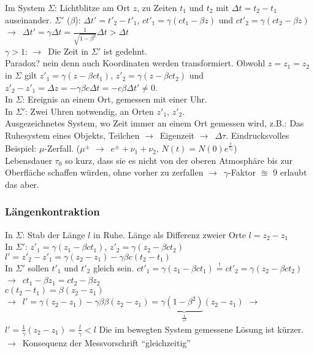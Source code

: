\documentclass[oneside]{book}
\theoremstyle{definition}
\newcommand{\conseq}{$\rightarrow$~}
\begin{document}
Im System $\Sigma$: Lichtblitze am Ort $z$, zu Zeiten $t_1$ und $t_2$ mit $\Delta t = t_2 - t_1$ auseinander.
$\Sigma'$ ($\beta$): $\Delta t' = t'_2 - t'_1$, $c t'_1 = \gamma (c t_1 - \beta z)$ und $c t'_2 = \gamma (ct_2 - \beta z)$\\
\conseq $\Delta t' = \gamma \Delta t = \frac{1}{\sqrt{1 - \beta^2}} \Delta t > \Delta t$\\
$\gamma > 1$: \conseq Die Zeit in $\Sigma'$ ist gedehnt.\\
Paradox? nein denn auch Koordinaten werden transformiert. Obwohl  $z = z_1 = z_2$ in $\Sigma$ gilt $z'_1 = \gamma (z - \beta c t_1)$, $z'_2 = \gamma (z - \beta c t_2)$ und $z'_2 - z'_1 = \Delta z = - \gamma \beta c \Delta t = - c \beta \Delta t' \neq 0$.\\
In $\Sigma$: Ereignis an einem Ort, gemessen mit einer Uhr.\\
In $\Sigma'$: Zwei Uhren notwendig, an Orten $z'_1$, $z'_2$.\\
Ausgezeichnetes System, wo Zeit immer an einem Ort gemessen wird, z.B.:
Das Ruhesystem eines Objekts, Teilchen \conseq Eigenzeit \conseq $\Delta \tau$.
Eindrucksvolles Beispiel: $\mu$-Zerfall. ($\mu^\pm$ \conseq $e^\pm + \nu_1 + \nu_2$, $N(t) = N(0) e^{\frac{t}{\tau_0}}$)\\
Lebensdauer $\tau_0$ so kurz, dass sie es nicht von der oberen Atmosphäre bis zur Oberfläche schaffen würden, ohne vorher zu zerfallen \conseq $\gamma$-Faktor $\approxeq$ 9 erlaubt das aber.

\subsubsection{Längenkontraktion}
In $\Sigma$: Stab der Länge $l$ in Ruhe. Länge als Differenz zweier Orte $l = z_2 - z_1$\\
In $\Sigma'$:  $z'_1 = \gamma (z_1 - \beta c t_1)$, $z'_2 = \gamma (z_2 - \beta c t_2)$\\
$l' = z'_2 - z'_1 = \gamma (z_2 - z_1) - \gamma \beta c (t_2 - t_1)$\\
In $\Sigma'$ sollen $t'_1$ und $t'_2$ gleich sein.
$c t'_1 = \gamma (z_1 - \beta c t_1) \overset{!}{=} c t'_2 = \gamma (z_2 - \beta c t_2)$\\
\conseq $c t_1 - \beta z_1 = c t_2 - \beta z_2$ \\ $c(t_2 - t_1) = \beta (z_2 - z_1)$\\
\conseq $l' = \gamma (z_2 - z_1) - \gamma \beta \beta (z_2 - z_1) = \gamma \underbrace{(1 - \beta^2)}_{\frac{1}{\gamma^2}} (z_2 - z_1)$
\conseq $l' = \frac{1}{\gamma} (z_2 - z_1) = \frac{l}{\gamma} < l$
Die im bewegten System gemessene Lösung ist kürzer. \conseq Konsequenz der Messvorschrift "`gleichzeitig"'
\end{document}

